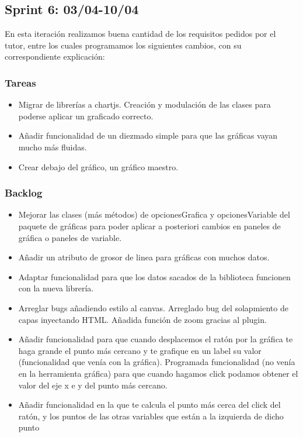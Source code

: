 \subsection{Sprint 6: 03/04-10/04}
En esta iteración realizamos buena cantidad de los requisitos pedidos por el tutor, entre los cuales programamos los siguientes cambios, con su correspondiente explicación:

\subsubsection{Tareas}
\begin{itemize}
	\item Migrar de librerías a chartjs. Creación y modulación de las clases para poderse aplicar un graficado correcto.

	\item Añadir funcionalidad de un diezmado simple para que las gráficas vayan mucho más fluidas.

	\item Crear debajo del gráfico, un gráfico maestro.

\end{itemize}






\subsubsection{Backlog}
\begin{itemize}
	\item Mejorar las clases (más métodos) de opcionesGrafica y opcionesVariable del paquete de gráficas para poder aplicar a posteriori cambios en paneles de gráfica o paneles de variable.

	\item Añadir un  atributo de grosor de linea para gráficas con muchos datos. 

	\item Adaptar  funcionalidad para que los datos sacados de la biblioteca funcionen con la nueva librería.

	\item Arreglar bugs añadiendo estilo al canvas. Arreglado bug del solapmiento de capas inyectando HTML. Añadida función de zoom gracias al plugin.

	\item Añadir funcionalidad para que cuando desplacemos el ratón por la gráfica te haga grande el punto más cercano y te grafique en un label su valor (funcionalidad que venía con la gráfica). Programada funcionalidad (no venía en la herramienta gráfica) para que cuando hagamos click podamos obtener el valor del eje x e y del punto más cercano.

	\item Añadir funcionalidad en la que te calcula el punto más cerca del click del ratón, y los puntos de las otras variables que están a la izquierda de dicho punto

\end{itemize}




